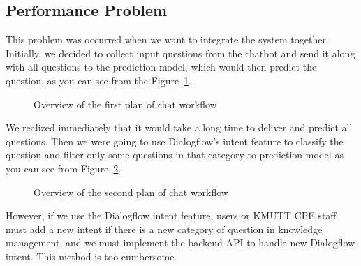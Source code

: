 \documentclass[12pt,oneside,openright,a4paper]{cpe-english-project}
\begin{document}
\subsection{Performance Problem}
This problem was occurred when we want to integrate the system together. Initially, we decided to
collect input questions from the chatbot and send it along with all questions to the prediction model,
which would then predict the question, as you can see from the Figure~\ref*{fig:chat_plan_1}.

\begin{figure}[!h]\centering
{}
\caption{Overview of the first plan of chat workflow}
\label{fig:chat_plan_1}
\end{figure}

We realized immediately that it would take a long time to deliver and predict all questions.
Then we were going to use Dialogflow's intent feature to classify the question and filter
only some questions in that category to prediction model as you can see from
Figure~\ref*{fig:chat_plan_2}.

\begin{figure}[!h]\centering
{}
\caption{Overview of the second plan of chat workflow}
\label{fig:chat_plan_2}
\end{figure}

However, if we use the Dialogflow intent feature, users or KMUTT CPE staff must add a new intent
if there is a new category of question in knowledge management, and we must implement the backend
API to handle new Dialogflow intent. This method is too cumbersome.
\end{document}
